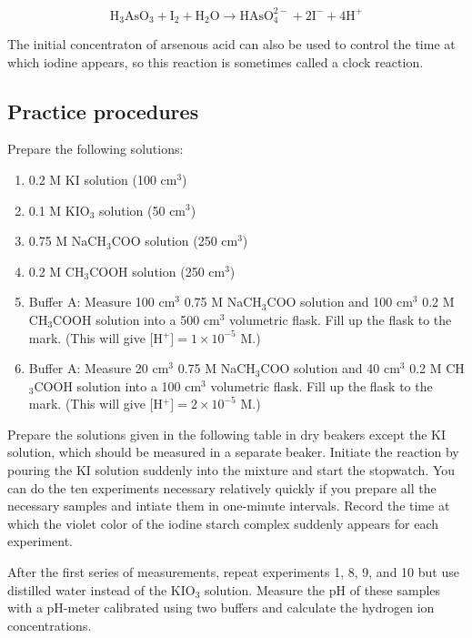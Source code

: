 \begin{equation}
\text{H}_{3}\text{AsO}_{3} + \text{I}_{2} + \text{H}_{2}\text{O}  \longrightarrow \text{HAsO}_{4}^{2-} +  2 \text{I}^{-}  + 4 \text{H}^{+}
\end{equation}

The initial concentraton of arsenous acid can also be used to control the time at which iodine appears, so this reaction is sometimes called a clock reaction.


\subsection{Practice procedures}

Prepare the following solutions:

\begin{enumerate}
\item 0.2 M KI solution (100 cm$^3$)
\item 0.1 M KIO$_3$ solution (50 cm$^3$)
\item 0.75 M NaCH$_3$COO solution (250 cm$^3$)
\item 0.2 M CH$_3$COOH solution (250 cm$^3$)
\item Buffer A: Measure 100 cm$^3$ 0.75 M NaCH$_3$COO solution and 100 cm$^3$ 0.2 M CH$_3$COOH solution into a 500 cm$^3$ volumetric flask. Fill up the flask to the mark. (This will give [H$^+] = 1 \times 10^{-5}$ M.)
\item Buffer A: Measure 20 cm$^3$ 0.75 M NaCH$_3$COO solution and 40 cm$^3$ 0.2 M CH$_3$COOH solution into a 100 cm$^3$ volumetric flask. Fill up the flask to the mark. (This will give [H$^+] = 2 \times 10^{-5}$ M.)
\end{enumerate}

Prepare the solutions given in the following table in dry beakers except the KI solution, which should be measured in a separate beaker. Initiate the reaction by pouring the KI solution suddenly into the mixture and start the stopwatch. You can do the ten experiments necessary relatively quickly if you prepare all the necessary samples and intiate them in one-minute intervals. Record the time at which the violet color of the iodine starch complex suddenly appears for each experiment.

After the first series of measurements, repeat experiments 1, 8, 9, and 10 but use distilled water instead of the KIO$_3$ solution. Measure the pH of these samples with a pH-meter calibrated using two buffers and calculate the hydrogen ion concentrations.

